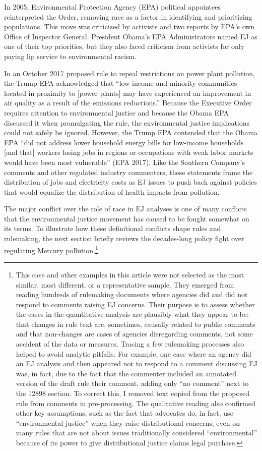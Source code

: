 \documentclass[
      12pt,
        ]{article}
\begin{document}
In 2005, Environmental Protection Agency (EPA) political appointees reinterpreted the Order, removing race as a factor in identifying and prioritizing populations. This move was criticized by activists and two reports by EPA's own Office of Inspector General. President Obama's EPA Administrators named EJ as one of their top priorities, but they also faced criticism from activists for only paying lip service to environmental racism.

In an October 2017 proposed rule to repeal
restrictions on power plant pollution, the Trump EPA acknowledged that
``low-income and minority communities located in proximity to {[}power
plants{]} may have experienced an improvement in air quality as a result
of the emissions reductions.'' Because the Executive Order requires
attention to environmental justice and because the Obama EPA discussed
it when promulgating the rule, the environmental justice implications could not safely
be ignored. However, the Trump EPA contended that the Obama EPA ``did not
address lower household energy bills for low-income households {[}and
that{]} workers losing jobs in regions or occupations with weak labor
markets would have been most vulnerable'' (EPA 2017). Like the Southern Company's comments and other regulated industry commenters, these statements frame the distribution of jobs and electricity costs as EJ issues to push back against policies that would equalize the distribution of health impacts from pollution.

The major conflict over the role of race in EJ analyses is one of many conflicts that the environmental justice movement has caused to be fought somewhat on its terms. To illustrate how these definitional conflicts shape rules and rulemaking, the next section briefly reviews the decades-long policy fight over regulating Mercury pollution.\footnote{This case and other examples in this article were not selected as the most similar, most different, or a representative sample. They emerged from reading hundreds of rulemaking documents where agencies did and did not respond to comments raising EJ concerns. Their purpose is to assess whether the cases in the quantitative analysis are plausibly what they appear to be: that changes in rule text are, sometimes, causally related to public comments and that non-changes are cases of agencies disregarding comments, not some accident of the data or measures. Tracing a few rulemaking processes also helped to avoid analytic pitfalls. For example, one case where an agency did an EJ analysis and then appeared not to respond to a comment discussing EJ was, in fact, due to the fact that the commenter included an annotated version of the draft rule their comment, adding only ``no comment'' next to the 12898 section. To correct this, I removed text copied from the proposed rule from comments in pre-processing. The qualitative reading also confirmed other key assumptions, such as the fact that advocates do, in fact, use ``environmental justice'' when they raise distributional concerns, even on many rules that are not about issues traditionally considered ``environmental'' because of its power to give distributional justice claims legal purchase.}
\end{document}
